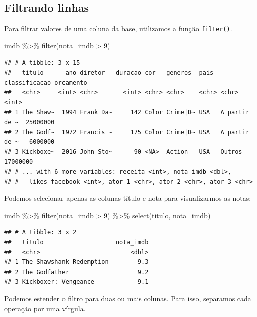\documentclass[
]{book}
\newenvironment{Shaded}{\begin{snugshade}}{\end{snugshade}}
\newcommand{\DecValTok}[1]{\textcolor[rgb]{0.00,0.00,0.81}{#1}}
\newcommand{\FunctionTok}[1]{\textcolor[rgb]{0.00,0.00,0.00}{#1}}
\newcommand{\NormalTok}[1]{#1}
\newcommand{\SpecialCharTok}[1]{\textcolor[rgb]{0.00,0.00,0.00}{#1}}
\begin{document}
\hypertarget{filtrando-linhas}{%
\subsection{Filtrando linhas}\label{filtrando-linhas}}

Para filtrar valores de uma coluna da base, utilizamos a função \texttt{filter()}.

\begin{Shaded}
\begin{Highlighting}[]
\NormalTok{imdb }\SpecialCharTok{\%\textgreater{}\%} \FunctionTok{filter}\NormalTok{(nota\_imdb }\SpecialCharTok{\textgreater{}} \DecValTok{9}\NormalTok{)}
\end{Highlighting}
\end{Shaded}

\begin{verbatim}
## # A tibble: 3 x 15
##   titulo      ano diretor   duracao cor   generos  pais  classificacao orcamento
##   <chr>     <int> <chr>       <int> <chr> <chr>    <chr> <chr>             <int>
## 1 The Shaw~  1994 Frank Da~     142 Color Crime|D~ USA   A partir de ~  25000000
## 2 The Godf~  1972 Francis ~     175 Color Crime|D~ USA   A partir de ~   6000000
## 3 Kickboxe~  2016 John Sto~      90 <NA>  Action   USA   Outros         17000000
## # ... with 6 more variables: receita <int>, nota_imdb <dbl>,
## #   likes_facebook <int>, ator_1 <chr>, ator_2 <chr>, ator_3 <chr>
\end{verbatim}

Podemos selecionar apenas as colunas título e nota para visualizarmos as notas:

\begin{Shaded}
\begin{Highlighting}[]
\NormalTok{imdb }\SpecialCharTok{\%\textgreater{}\%} 
  \FunctionTok{filter}\NormalTok{(nota\_imdb }\SpecialCharTok{\textgreater{}} \DecValTok{9}\NormalTok{) }\SpecialCharTok{\%\textgreater{}\%} 
  \FunctionTok{select}\NormalTok{(titulo, nota\_imdb)}
\end{Highlighting}
\end{Shaded}

\begin{verbatim}
## # A tibble: 3 x 2
##   titulo                    nota_imdb
##   <chr>                         <dbl>
## 1 The Shawshank Redemption        9.3
## 2 The Godfather                   9.2
## 3 Kickboxer: Vengeance            9.1
\end{verbatim}

Podemos estender o filtro para duas ou mais colunas. Para isso, separamos cada operação por uma vírgula.
\end{document}
